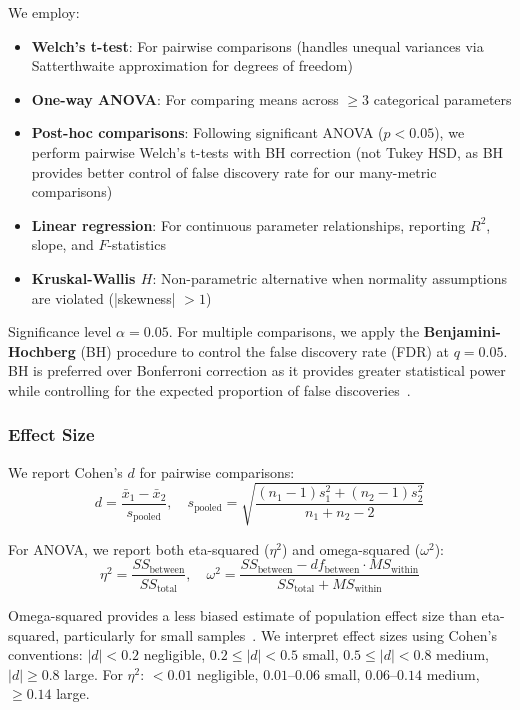 We employ:
\begin{itemize}
    \item \textbf{Welch's t-test}: For pairwise comparisons (handles unequal variances via Satterthwaite approximation for degrees of freedom)
    \item \textbf{One-way ANOVA}: For comparing means across $\geq 3$ categorical parameters
    \item \textbf{Post-hoc comparisons}: Following significant ANOVA ($p < 0.05$), we perform pairwise Welch's t-tests with BH correction (not Tukey HSD, as BH provides better control of false discovery rate for our many-metric comparisons)
    \item \textbf{Linear regression}: For continuous parameter relationships, reporting $R^2$, slope, and $F$-statistics
    \item \textbf{Kruskal-Wallis $H$}: Non-parametric alternative when normality assumptions are violated (|skewness| $> 1$)
\end{itemize}

Significance level $\alpha = 0.05$. For multiple comparisons, we apply the \textbf{Benjamini-Hochberg} (BH) procedure to control the false discovery rate (FDR) at $q = 0.05$. BH is preferred over Bonferroni correction as it provides greater statistical power while controlling for the expected proportion of false discoveries~\cite{benjamini1995}.

\subsubsection{Effect Size}

We report Cohen's $d$ for pairwise comparisons:
\begin{equation}
d = \frac{\bar{x}_1 - \bar{x}_2}{s_{\text{pooled}}}, \quad s_{\text{pooled}} = \sqrt{\frac{(n_1-1)s_1^2 + (n_2-1)s_2^2}{n_1+n_2-2}}
\end{equation}

For ANOVA, we report both eta-squared ($\eta^2$) and omega-squared ($\omega^2$):
\begin{equation}
\eta^2 = \frac{SS_{\text{between}}}{SS_{\text{total}}}, \quad \omega^2 = \frac{SS_{\text{between}} - df_{\text{between}} \cdot MS_{\text{within}}}{SS_{\text{total}} + MS_{\text{within}}}
\end{equation}

Omega-squared provides a less biased estimate of population effect size than eta-squared, particularly for small samples~\cite{cohen1988statistical}. We interpret effect sizes using Cohen's conventions: $|d| < 0.2$ negligible, $0.2 \leq |d| < 0.5$ small, $0.5 \leq |d| < 0.8$ medium, $|d| \geq 0.8$ large. For $\eta^2$: $< 0.01$ negligible, $0.01$--$0.06$ small, $0.06$--$0.14$ medium, $\geq 0.14$ large.

